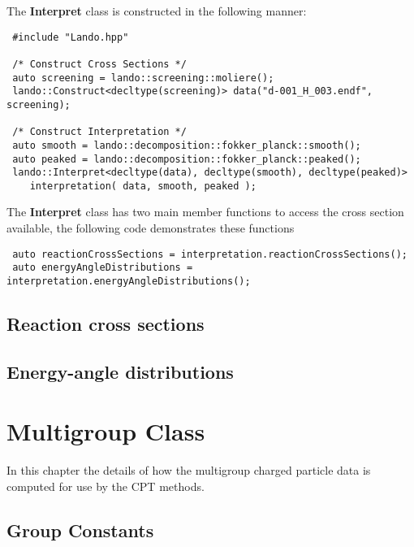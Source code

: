 \documentclass[../main.tex]{subfiles}
\begin{document}
The \textbf{Interpret} class is constructed in the following manner:
\begin{verbatim}
 #include "Lando.hpp"

 /* Construct Cross Sections */
 auto screening = lando::screening::moliere();
 lando::Construct<decltype(screening)> data("d-001_H_003.endf", screening);

 /* Construct Interpretation */
 auto smooth = lando::decomposition::fokker_planck::smooth();
 auto peaked = lando::decomposition::fokker_planck::peaked();
 lando::Interpret<decltype(data), decltype(smooth), decltype(peaked)> 
    interpretation( data, smooth, peaked );
\end{verbatim}
The \textbf{Interpret} class has two main member functions to access the cross section available, the following code demonstrates these functions
\begin{verbatim}
 auto reactionCrossSections = interpretation.reactionCrossSections();
 auto energyAngleDistributions = interpretation.energyAngleDistributions();
\end{verbatim}

\subsection{Reaction cross sections}

\subsection{Energy-angle distributions}

\section{Multigroup Class}
In this chapter the details of how the multigroup charged particle data is computed for use by the CPT methods.

\subsection{Group Constants}
\end{document}
